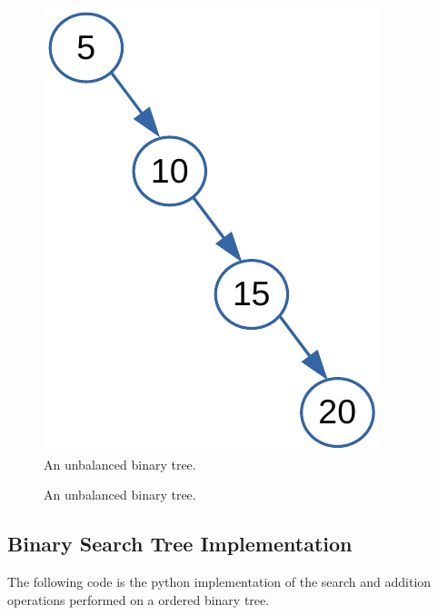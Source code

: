 \begin{figure}[H]
	\begin{center}
		\includegraphics[scale=.6]{chapters/trees/images/trees_15.pdf}
		\caption[An unbalanced binary tree.]{An unbalanced binary tree.}
		\label{trees_15}
	\end{center}
\end{figure}

\begin{figure}[H]
\centering
{}
\caption[An unbalanced binary tree.]{An unbalanced binary tree.}
\label{trees_15}
\end{figure}

\subsection{Binary Search Tree Implementation}
The following code is the python implementation of the search and addition operations performed on a ordered binary tree.

